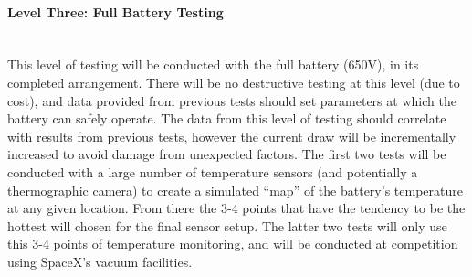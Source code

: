 \documentclass{report}
\let\oldparagraph\paragraph
\renewcommand{\paragraph}[1]{\oldparagraph{#1}\mbox{}\\}
\begin{document}
    \paragraph{Level Three: Full Battery Testing}
    This level of testing will be conducted with the full battery (650V), in its completed arrangement. There will be no destructive testing at this level (due to cost), and data provided from previous tests should set parameters at which the battery can safely operate. The data from this level of testing should correlate with results from previous tests, however the current draw will be incrementally increased to avoid damage from unexpected factors. The first two tests will be conducted with a large number of temperature sensors (and potentially a thermographic camera) to create a simulated “map” of the battery’s temperature at any given location. From there the 3-4 points that have the tendency to be the hottest will chosen for the final sensor setup. The latter two tests will only use this 3-4 points of temperature monitoring, and will be conducted at competition using SpaceX’s vacuum facilities.
\end{document}
